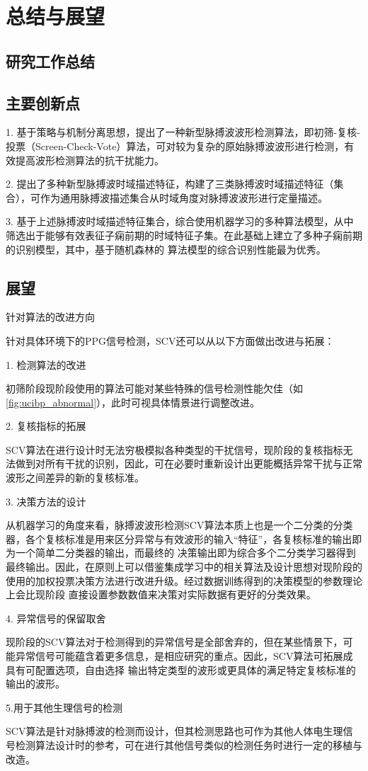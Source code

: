 \chapter{总结与展望}
\section{研究工作总结}
\section{主要创新点}
1. 基于策略与机制分离思想，提出了一种新型脉搏波波形检测算法，即初筛-复核-投票（Screen-Check-Vote）算法，可对较为复杂的原始脉搏波波形进行检测，有效提高波形检测算法的抗干扰能力。

2. 提出了多种新型脉搏波时域描述特征，构建了三类脉搏波时域描述特征（集合），可作为通用脉搏波描述集合从时域角度对脉搏波波形进行定量描述。

3. 基于上述脉搏波时域描述特征集合，综合使用机器学习的多种算法模型，从中筛选出于能够有效表征子痫前期的时域特征子集。在此基础上建立了多种子痫前期的识别模型，其中，基于随机森林的
算法模型的综合识别性能最为优秀。

\section{展望}

针对算法的改进方向

针对具体环境下的PPG信号检测，SCV还可以从以下方面做出改进与拓展：

1. 检测算法的改进

初筛阶段现阶段使用的算法可能对某些特殊的信号检测性能欠佳（如\autoref{fig:ucibp_abnormal}），此时可视具体情景进行调整改进。

2. 复核指标的拓展

SCV算法在进行设计时无法穷极模拟各种类型的干扰信号，现阶段的复核指标无法做到对所有干扰的识别，因此，可在必要时重新设计出更能概括异常干扰与正常波形之间差异的新的复核标准。

3. 决策方法的设计

从机器学习的角度来看，脉搏波波形检测SCV算法本质上也是一个二分类的分类器，各个复核标准是用来区分异常与有效波形的输入“特征”，各复核标准的输出即为一个简单二分类器的输出，而最终的
决策输出即为综合多个二分类学习器得到最终输出。因此，在原则上可以借鉴集成学习中的相关算法及设计思想对现阶段的使用的加权投票决策方法进行改进升级。经过数据训练得到的决策模型的参数理论上会比现阶段
直接设置参数数值来决策对实际数据有更好的分类效果。

4. 异常信号的保留取舍

现阶段的SCV算法对于检测得到的异常信号是全部舍弃的，但在某些情景下，可能异常信号可能蕴含着更多信息，是相应研究的重点。因此，SCV算法可拓展成具有可配置选项，自由选择
输出特定类型的波形或更具体的满足特定复核标准的输出的波形。

5.用于其他生理信号的检测

SCV算法是针对脉搏波的检测而设计，但其检测思路也可作为其他人体电生理信号检测算法设计时的参考，可在进行其他信号类似的检测任务时进行一定的移植与改造。
